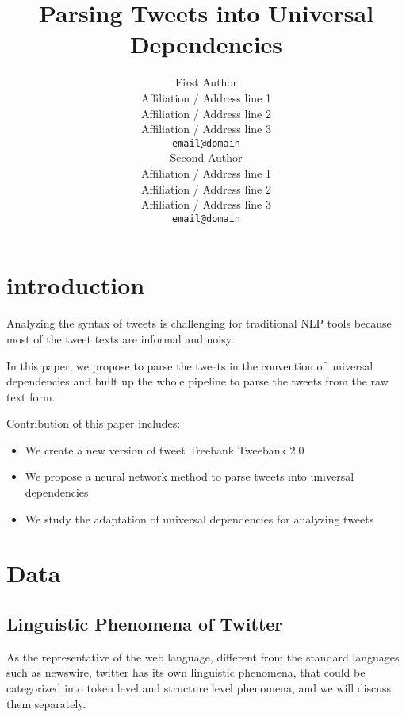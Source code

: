 \documentclass[11pt,letterpaper]{article}
\title{Parsing Tweets into Universal Dependencies}
\author{First Author \\
  Affiliation / Address line 1 \\
  Affiliation / Address line 2 \\
  Affiliation / Address line 3 \\
  {\tt email@domain} \\\And
  Second Author \\
  Affiliation / Address line 1 \\
  Affiliation / Address line 2 \\
  Affiliation / Address line 3 \\
  {\tt email@domain} \\}
\date{}
\begin{document}
\maketitle
\begin{abstract}

\end{abstract}




\section{introduction}
Analyzing the syntax of tweets is challenging for traditional NLP tools because most of the tweet texts are informal and noisy.

In this paper, we propose to parse the tweets in the convention of universal dependencies and built up the whole pipeline to parse the tweets from the raw text form.

Contribution of this paper includes:
\begin{itemize}
\item We create a new version of tweet Treebank Tweebank 2.0
\item We propose a neural network method to parse tweets into universal dependencies
\item We study the adaptation of universal dependencies for analyzing tweets
\end{itemize}



\section{Data}

\subsection{Linguistic Phenomena of Twitter} \label{lingphen}
As the representative of the web language, different from the standard languages such as newswire, twitter has its own linguistic phenomena, that could be categorized into token level and structure level phenomena, and we will discuss them separately.
\end{document}
